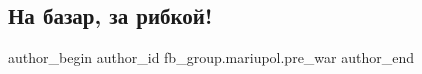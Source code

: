  
 
 
 
 

\subsection{На базар, за рибкой!}
\label{sec:26_02_2023.fb.fb_group.mariupol.pre_war.1.na_bazar__za_ribkoi_}

\ifcmt
 author_begin
   author_id fb_group.mariupol.pre_war
 author_end
\fi
